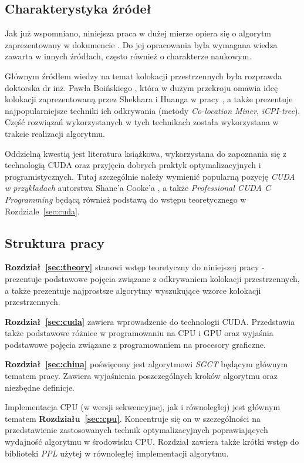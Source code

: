 \documentclass[12pt]{article}
\begin{document}
\subsection{Charakterystyka źródeł}

Jak już wspomniano, niniejsza praca w dużej mierze opiera się o algorytm zaprezentowany w dokumencie \cite{chinczyki}. Do jej opracowania była wymagana wiedza zawarta w innych źródłach, często również o charakterze naukowym.

Głównym źródłem wiedzy na temat kolokacji przestrzennych była rozprawda doktorska dr inż. Pawła Boińskiego \cite{boinski}, która w dużym przekroju omawia ideę kolokacji zaprezentowaną przez Shekhara i Huanga w pracy \cite{huang}, a także prezentuje najpopularniejsze techniki ich odkrywania (metody \textit{Co-location Miner}, \textit{iCPI-tree}). Część rozwiązań wykorzystanych w tych technikach została wykorzystana w trakcie realizacji algorytmu.

Oddzielną kwestią jest literatura książkowa, wykorzystana do zapoznania się z technologią CUDA oraz przyjęcia dobrych praktyk optymalizacyjnych i programistycznych. Tutaj szczególnie należy wymienić popularną pozycję \textit{CUDA w przykładach} autorstwa Shane'a Cooke'a \cite{cuda_by_examples}, a także \textit{Professional CUDA C Programming} \cite{professional_cuda} będącą również podstawą do wstępu teoretycznego w Rozdziale~\ref{sec:cuda}.

\subsection{Struktura pracy}

\textbf{Rozdział~\ref{sec:theory}} stanowi wstęp teoretyczny do niniejszej pracy - prezentuje podstawowe pojęcia związane z odkrywaniem kolokacji przestrzennych, a także prezentuje najprostsze algorytmy wyszukujące wzorce kolokacji przestrzennych.

\textbf{Rozdział~\ref{sec:cuda}} zawiera wprowadzenie do technologii CUDA. Przedstawia także podstawowe różnice w programowaniu na CPU i GPU oraz wyjaśnia podstawowe pojęcia związane z programowaniem na procesory graficzne.

\textbf{Rozdział~\ref{sec:china}} poświęcony jest algorytmowi \textit{SGCT} będącym głównym tematem pracy. Zawiera wyjaśnienia poszczególnych kroków algorytmu oraz niezbędne definicje.

Implementacja CPU (w wersji sekwencyjnej, jak i równoległej) jest głównym tematem \textbf{Rozdziału~\ref{sec:cpu}}. Koncentruje się on w szczególności na przedstawienie zastosowanych technik optymalizacyjnych poprawiających wydajność algorytmu w środowisku CPU. Rozdział zawiera także krótki wstęp do biblioteki \textit{PPL} użytej w równoległej implementacji algorytmu.
\end{document}
